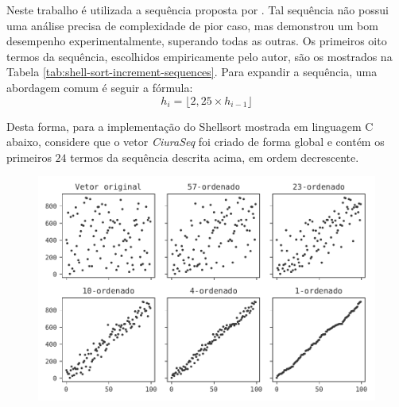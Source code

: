Neste trabalho é utilizada a sequência proposta por \cite{ciura2001best}. Tal sequência não possui uma análise precisa de complexidade de pior caso, mas demonstrou um bom desempenho experimentalmente, superando todas as outras. Os primeiros oito termos da sequência, escolhidos empiricamente pelo autor, são os mostrados na Tabela \ref{tab:shell-sort-increment-sequences}. Para expandir a sequência, uma abordagem comum é seguir a fórmula:  
\[
h_i = \lfloor 2,25 \times h_{i-1} \rfloor
\]

Desta forma, para a implementação do Shellsort mostrada em linguagem C abaixo, considere que o vetor \textit{CiuraSeq} foi criado de forma global e contém os primeiros $24$ termos da sequência descrita acima, em ordem decrescente.



\begin{figure}[H]
\centering
\includegraphics[scale=0.9]{figuras/pdf/shellsort.pdf}
\end{figure}
